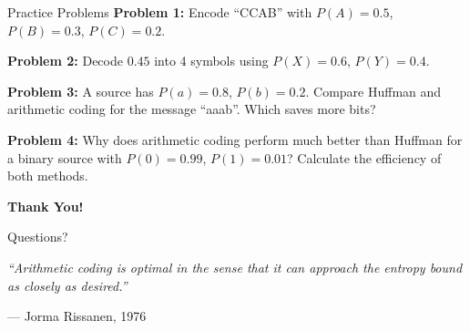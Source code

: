 \documentclass[aspectratio=169,12pt]{beamer}
\begin{document}
\begin{frame}{Practice Problems}
    \textbf{Problem 1:} Encode ``CCAB'' with $P(A)=0.5$, $P(B)=0.3$, $P(C)=0.2$.
    
    \vspace{0.3cm}
    \textbf{Problem 2:} Decode $0.45$ into 4 symbols using $P(X)=0.6$, $P(Y)=0.4$.
    
    \vspace{0.3cm}
    \textbf{Problem 3:} A source has $P(a)=0.8$, $P(b)=0.2$. Compare Huffman and arithmetic coding for the message ``aaab''. Which saves more bits?
    
    \vspace{0.3cm}
    \textbf{Problem 4:} Why does arithmetic coding perform much better than Huffman for a binary source with $P(0)=0.99$, $P(1)=0.01$? Calculate the efficiency of both methods.
\end{frame}

\begin{frame}
    \begin{center}
        \Huge{\textbf{Thank You!}}
        
        \vspace{1cm}
        \Large{Questions?}
        
        \vspace{1.5cm}
        \normalsize
        \textit{``Arithmetic coding is optimal in the sense that it can approach the entropy bound as closely as desired.''}
        
        \vspace{0.3cm}
        --- Jorma Rissanen, 1976
    \end{center}
\end{frame}
\end{document}
